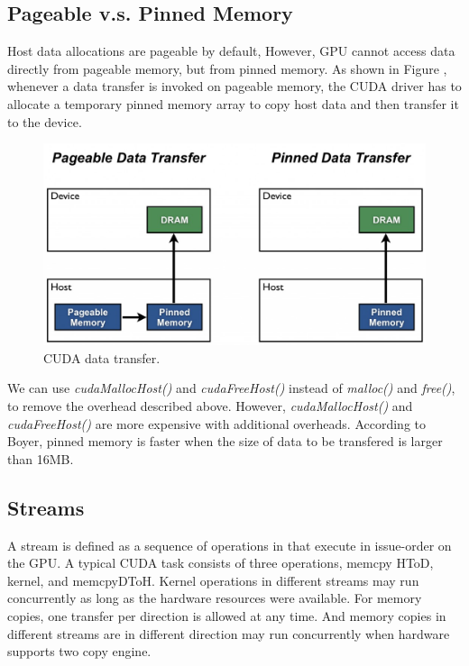 \documentclass[journal,11pt,onecolumn,draftclsnofoot]{ieeeconf}  %
\begin{document}
\subsection{Pageable v.s. Pinned Memory} \label{pinned}
Host data allocations are pageable by default, However, GPU cannot access data directly from pageable memory, but from pinned memory. As shown in Figure \cite{Mark}, whenever a data transfer is invoked on pageable memory, the CUDA driver has to allocate a temporary pinned memory array to copy host data and then transfer it to the device. \par
\begin{figure}[h]

	\centering\includegraphics[width=120mm]{pinned.jpg}
	\caption{CUDA data transfer.\cite{Mark}}
	\label{CUDA data transfer.}
		\vspace*{-5mm}
\end{figure}
We can use \textit{cudaMallocHost()} and \textit{cudaFreeHost()} instead of \textit{malloc()} and \textit{free()}, to remove the overhead described above. However, \textit{cudaMallocHost()} and \textit{cudaFreeHost()} are more expensive with additional overheads. According to Boyer\cite{Trade_off}, pinned memory is faster when the size of data to be transfered is larger than 16MB. \par

\subsection{Streams} \label{stream}
A stream is defined as a sequence of operations in that execute in issue-order on the GPU. A typical CUDA task consists of three operations, memcpy HToD, kernel, and memcpyDToH. Kernel operations in different streams may run concurrently as long as the hardware resources were available. For memory copies, one transfer per direction is allowed at any time. And memory copies in different streams are in different direction may run concurrently when hardware supports two copy engine.   \par
\end{document}
